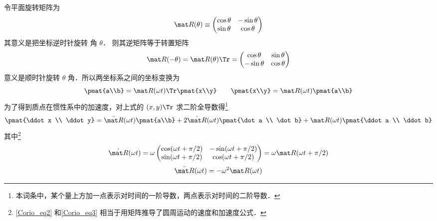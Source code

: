 令平面旋转矩阵为%
\begin{equation}
\mat R(\theta) \equiv \begin{pmatrix}
{\cos \theta }&{ - \sin \theta }\\
{\sin \theta }&{\cos \theta }
\end{pmatrix}
\end{equation}
其意义是把坐标逆时针旋转 角 $\theta$．
则其逆矩阵等于转置矩阵
\begin{equation}
\mat R(- \theta) = \mat R (\theta)\Tr =  \begin{pmatrix}
{\cos \theta }&{\sin \theta }\\
{ - \sin \theta }&{\cos \theta }
\end{pmatrix}
\end{equation}
意义是顺时针旋转 $\theta$ 角．所以两坐标系之间的坐标变换为
\begin{equation}
\pmat{a\\b} = \mat R(\omega t)\Tr \pmat{x\\y}
\qquad
\pmat{x\\y} = \mat R(\omega t) \pmat{a\\b}
\end{equation}
为了得到质点在惯性系中的加速度，对上式的 $(x,y)\Tr$ 求二阶全导数得\footnote{本词条中，某个量上方加一点表示对时间的一阶导数，两点表示对时间的二阶导数．}
\begin{equation}\label{Corio_eq1}
\pmat{\ddot x \\ \ddot y} = 
\ddot{\mat R}(\omega t) \pmat{a\\b} + 2\dot{\mat R} (\omega t) \pmat{\dot a \\ \dot b} + \mat R(\omega t)\pmat{\ddot a \\ \ddot b}
\end{equation}
其中\footnote{\autoref{Corio_eq2} 和\autoref{Corio_eq3} 相当于用矩阵推导了圆周运动的速度和加速度公式．}
\begin{equation}\label{Corio_eq2}
\dot{\mat R}(\omega t) = \omega \begin{pmatrix}
\cos (\omega t + \pi /2) &  - \sin (\omega t + \pi /2)\\
\sin (\omega t + \pi /2) & \cos(\omega t + \pi /2)
\end{pmatrix}
= \omega \mat R(\omega t + \pi /2)
\end{equation}
\begin{equation}\label{Corio_eq3}
\ddot{\mat R} (\omega t)  =  - {\omega ^2}\mat R (\omega t)
\end{equation}
